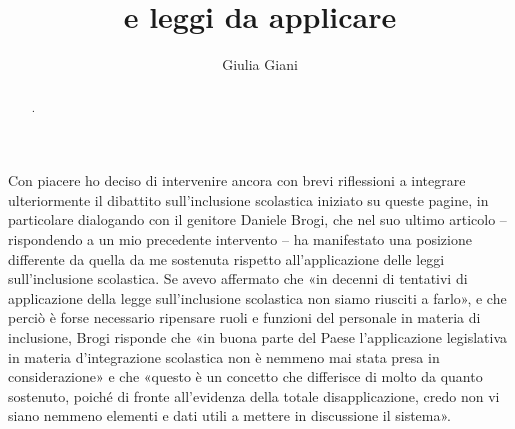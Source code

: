 \author{Giulia Giani}
\title{ e leggi da applicare }
\label{cha:giani140513}
\begin{abstract}
. 
\end{abstract}
\maketitle
{}
Con piacere ho deciso di intervenire ancora con brevi riflessioni a integrare ulteriormente il dibattito sull'inclusione scolastica iniziato su queste pagine, in particolare dialogando con il genitore Daniele Brogi, che nel suo ultimo articolo\pageref{brogi030513} – rispondendo a un mio precedente intervento\pageref{cha:giani300413} – ha manifestato una posizione differente da quella da me sostenuta rispetto all'applicazione delle leggi sull'inclusione scolastica.
Se avevo affermato che «in decenni di tentativi di applicazione della legge sull'inclusione scolastica non siamo riusciti a farlo», e che perciò è forse necessario ripensare ruoli e funzioni del personale in materia di inclusione, Brogi risponde che «in buona parte del Paese l'applicazione legislativa in materia d'integrazione scolastica non è nemmeno mai stata presa in considerazione» e che «questo è un concetto che differisce di molto da quanto sostenuto, poiché di fronte all'evidenza della totale disapplicazione, credo non vi siano nemmeno elementi e dati utili a mettere in discussione il sistema».

